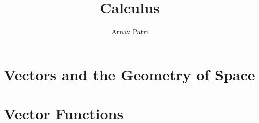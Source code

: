 \documentclass[12pt, A4]{report}
\title{Calculus \Roman{3}}
\author{Arnav Patri}
\begin{document}
	\maketitle
	\tableofcontents
	\setcounter{chapter}{11}
		\chapter{Vectors and the Geometry of Space}
			
		\chapter{Vector Functions}
			
\end{document}
